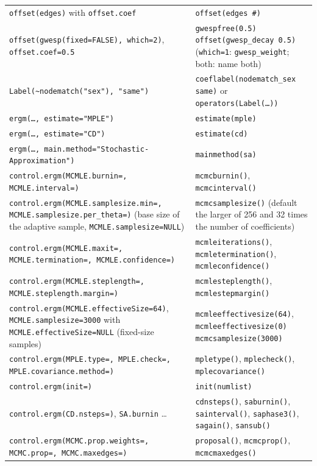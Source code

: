 \begin{longtable}{@{}>{\raggedright\arraybackslash}p{6.4cm}>{\raggedright\arraybackslash}p{9.3cm}@{}}
\texttt{offset(edges)} with \texttt{offset.coef} & \texttt{offset(edges \#)}\\
\texttt{offset(gwesp(fixed=FALSE), which=2)}, \texttt{offset.coef=0.5} & \texttt{gwespfree(0.5) offset(gwesp\_decay 0.5)} (\texttt{which=1}: \texttt{gwesp\_weight}; both: name both)\\
\texttt{Label(\textasciitilde nodematch("sex"), "same")} & \texttt{coeflabel(nodematch\_sex same)} or \texttt{operators(Label(\ldots))}\\
\texttt{ergm(\ldots, estimate="MPLE")} & \texttt{estimate(mple)}\\
\texttt{ergm(\ldots, estimate="CD")} & \texttt{estimate(cd)}\\
\texttt{ergm(\ldots, main.method=}\allowbreak\texttt{"Stochastic-Approximation")} & \texttt{mainmethod(sa)}\\
\texttt{control.ergm(MCMLE.burnin=, MCMLE.interval=)} & \texttt{mcmcburnin()}, \texttt{mcmcinterval()}\\
\texttt{control.ergm(MCMLE.samplesize.min=, MCMLE.samplesize.per\_theta=)} (base size of the adaptive sample, \texttt{MCMLE.samplesize=NULL}) & \texttt{mcmcsamplesize()} (default the larger of 256 and 32 times the number of coefficients)\\
\texttt{control.ergm(MCMLE.maxit=, MCMLE.termination=, MCMLE.confidence=)} & \texttt{mcmleiterations()}, \texttt{mcmletermination()}, \texttt{mcmleconfidence()}\\
\texttt{control.ergm(MCMLE.steplength=, MCMLE.steplength.margin=)} & \texttt{mcmlesteplength()}, \texttt{mcmlestepmargin()}\\
\texttt{control.ergm(MCMLE.effectiveSize=64)}, \texttt{MCMLE.samplesize=3000} with \texttt{MCMLE.effectiveSize=NULL} (fixed-size samples) & \texttt{mcmleeffectivesize(64)}, \texttt{mcmleeffectivesize(0) mcmcsamplesize(3000)}\\
\texttt{control.ergm(MPLE.type=, MPLE.check=, MPLE.covariance.method=)} & \texttt{mpletype()}, \texttt{mplecheck()}, \texttt{mplecovariance()}\\
\texttt{control.ergm(init=)} & \texttt{init(numlist)}\\
\texttt{control.ergm(CD.nsteps=)}, \texttt{SA.burnin} \ldots & \texttt{cdnsteps()}, \texttt{saburnin()}, \texttt{sainterval()}, \texttt{saphase3()}, \texttt{sagain()}, \texttt{sansub()}\\
\texttt{control.ergm(MCMC.prop.weights=, MCMC.prop=, MCMC.maxedges=)} & \texttt{proposal()}, \texttt{mcmcprop()}, \texttt{mcmcmaxedges()}\\

\end{longtable}
